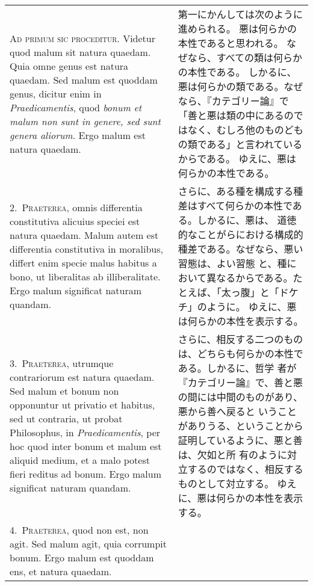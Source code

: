 \documentclass[10pt]{jsarticle} %
\begin{document}
\begin{longtable}{p{21em}p{21em}}

{\huge A}{\scshape d primum sic proceditur}. Videtur quod malum sit
natura quaedam. Quia omne genus est natura quaedam. Sed malum est
quoddam genus, dicitur enim in {\itshape Praedicamentis}, quod {\itshape
bonum et malum non sunt in genere, sed sunt genera aliorum}. Ergo malum
est natura quaedam.

&
第一にかんしては次のように進められる。
悪は何らかの本性であると思われる。
なぜなら、すべての類は何らかの本性である。
しかるに、悪は何らかの類である。なぜなら、『カテゴリー論』で「善と悪は類の中にあるのではなく、むしろ他のものどもの類である」と言われているからである。
ゆえに、悪は何らかの本性である。

\\


2.~{\scshape Praeterea}, omnis differentia constitutiva alicuius speciei
est natura quaedam. Malum autem est differentia constitutiva in
moralibus, differt enim specie malus habitus a bono, ut liberalitas ab
illiberalitate. Ergo malum significat naturam quandam.

&

さらに、ある種を構成する種差はすべて何らかの本性である。しかるに、悪は、
道徳的なことがらにおける構成的種差である。なぜなら、悪い習態は、よい習態
と、種において異なるからである。たとえば、「太っ腹」と「ドケチ」のように。
ゆえに、悪は何らかの本性を表示する。

\\


3.~{\scshape Praeterea}, utrumque contrariorum est natura quaedam. Sed
malum et bonum non opponuntur ut privatio et habitus, sed ut contraria,
ut probat Philosophus, in {\itshape Praedicamentis}, per hoc quod inter
bonum et malum est aliquid medium, et a malo potest fieri reditus ad
bonum. Ergo malum significat naturam quandam.

&

さらに、相反する二つのものは、どちらも何らかの本性である。しかるに、哲学
者が『カテゴリー論』で、善と悪の間には中間のものがあり、悪から善へ戻ると
いうことがありうる、ということから証明しているように、悪と善は、欠如と所
有のように対立するのではなく、相反するものとして対立する。
ゆえに、悪は何らかの本性を表示する。

\\


4.~{\scshape Praeterea}, quod non est, non agit. Sed malum agit, quia
corrumpit bonum. Ergo malum est quoddam ens, et natura quaedam.


\end{longtable}
\end{document}
